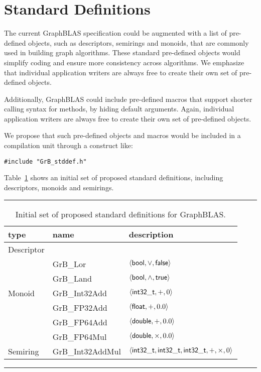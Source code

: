 \section{Standard Definitions}
\label{Sec:stddef}

\newcommand{\integer}{{\sf int32\_t}}
\newcommand{\float}{{\sf float}}
\newcommand{\double}{{\sf double}}
\newcommand{\bool}{{\sf bool}}
\newcommand{\false}{{\sf false}}
\newcommand{\true}{{\sf true}}

The current GraphBLAS specification could be augmented with a list of 
pre-defined objects, such as descriptors, semirings and monoids, that are commonly used
in building graph algorithms. These standard pre-defined objects would
simplify coding and ensure more consistency across algorithms. 
We emphasize
that individual application writers are always free to create their own set of
pre-defined objects.

Additionally, GraphBLAS could include pre-defined macros that support
shorter calling syntax for methods, by hiding default arguments. 
Again, individual application writers are always free to create their
own set of pre-defined objects.

We propose that such pre-defined objects and macros would
be included in a compilation unit through a construct like:

\begin{verbatim}
#include "GrB_stddef.h"
\end{verbatim}

Table~\ref{Tab:stddef} shows an initial set of proposed standard
definitions, including descriptors, monoids and semirings.

\begin{table}[htb]
	\hrule
	\caption{Initial set of proposed standard definitions for GraphBLAS.}
	\label{Tab:stddef}
	\begin{center}
	\begin{tabular}{|l|l|l|} \hline
		type		& name			& description \\ \hline
		Descriptor	& \\ \hline
				& {GrB\_Lor}		& $\left\langle \bool, \vee, \false \right\rangle$ \\
				& {GrB\_Land}		& $\left\langle \bool, \wedge, \true \right\rangle$ \\
		Monoid		& {GrB\_Int32Add}	& $\left\langle \integer, +, 0 \right\rangle$ \\
				& {GrB\_FP32Add}	& $\left\langle \float, +, 0.0 \right\rangle$ \\
				& {GrB\_FP64Add}	& $\left\langle \double, +, 0.0 \right\rangle$ \\ 
				& {GrB\_FP64Mul}	& $\left\langle \double, \times, 0.0 \right\rangle$ \\ \hline
		Semiring	& {GrB\_Int32AddMul}	& $\left\langle \integer, \integer, \integer, +, \times, 0 \right\rangle$ \\ \hline
	\end{tabular}
	\end{center}
	\hrule
\end{table}
